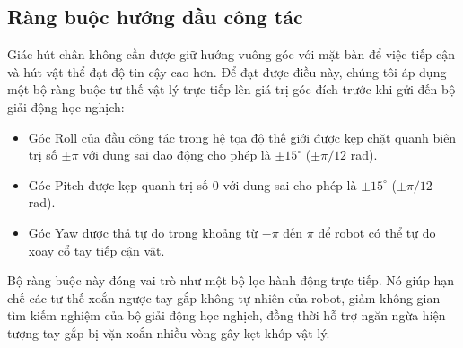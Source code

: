\documentclass[conference]{IEEEtran}
\begin{document}
\subsection{Ràng buộc hướng đầu công tác}
Giác hút chân không cần được giữ hướng vuông góc với mặt bàn để việc tiếp cận và hút vật thể đạt độ tin cậy cao hơn. Để đạt được điều này, chúng tôi áp dụng một bộ ràng buộc tư thế vật lý trực tiếp lên giá trị góc đích trước khi gửi đến bộ giải động học nghịch:
\begin{itemize}
    \item Góc Roll của đầu công tác trong hệ tọa độ thế giới được kẹp chặt quanh biên trị số $\pm\pi$ với dung sai dao động cho phép là $\pm15^\circ$ ($\pm\pi/12$ rad).
    \item Góc Pitch được kẹp quanh trị số 0 với dung sai cho phép là $\pm15^\circ$ ($\pm\pi/12$ rad).
    \item Góc Yaw được thả tự do trong khoảng từ $-\pi$ đến $\pi$ để robot có thể tự do xoay cổ tay tiếp cận vật.
\end{itemize}
Bộ ràng buộc này đóng vai trò như một bộ lọc hành động trực tiếp. Nó giúp hạn chế các tư thế xoắn ngược tay gắp không tự nhiên của robot, giảm không gian tìm kiếm nghiệm của bộ giải động học nghịch, đồng thời hỗ trợ ngăn ngừa hiện tượng tay gắp bị vặn xoắn nhiều vòng gây kẹt khớp vật lý.
\end{document}
